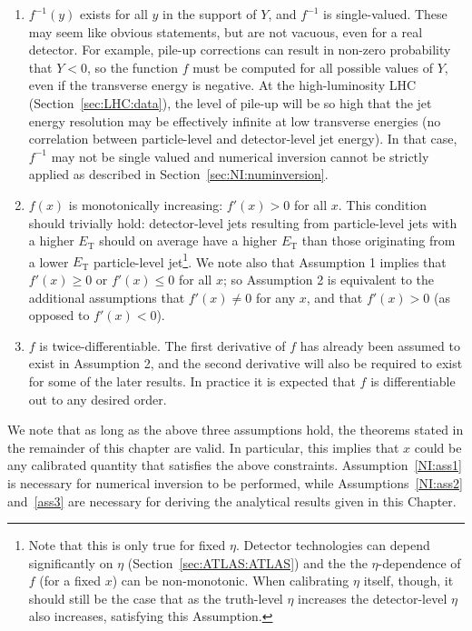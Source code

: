 \begin{enumerate}
  \item $f^{-1}(y)$ exists for all $y$ in the support of $Y$, and $f^{-1}$ is single-valued.  These may seem like obvious statements, but are not vacuous, even for a real detector.  For example, pile-up corrections can result in non-zero probability that $Y<0$, so the function $f$ must be computed for all possible values of $Y$, even if the transverse energy is negative.  At the high-luminosity LHC (Section~\ref{sec:LHC:data}), the level of pile-up will be so high that the jet energy resolution may be effectively infinite at low transverse energies (no correlation between particle-level and detector-level jet energy).  In that case, $f^{-1}$ may not be single valued and numerical inversion cannot be strictly applied as described in Section~\ref{sec:NI:numinversion}.
    \label{NI:ass1}
  \item $f(x)$ is monotonically increasing: $f'(x)>0$ for all $x$.  This condition should trivially hold: detector-level jets resulting from particle-level jets with a higher $E_\text{T}$ should on average have a higher $E_\text{T}$ than those originating from a lower $E_\text{T}$ particle-level jet\footnote{Note that this is only true for fixed $\eta$. Detector technologies can depend significantly on $\eta$ (Section~\ref{sec:ATLAS:ATLAS}) and the the $\eta$-dependence of $f$ (for a fixed $x$) can be non-monotonic. When calibrating $\eta$ itself, though, it should still be the case that as the truth-level $\eta$ increases the detector-level $\eta$ also increases, satisfying this Assumption.}. We note also that Assumption 1 implies that $f'(x)\ge 0$ or $f'(x) \le 0$ for all $x$; so Assumption 2 is equivalent to the additional assumptions that $f'(x)\ne 0$ for any $x$, and that $f'(x)>0$ (as opposed to $f'(x)<0$).
    \label{NI:ass2}
\item $f$ is twice-differentiable. The first derivative of $f$ has already been assumed to exist in Assumption 2, and the second derivative will also be required to exist for some of the later results. In practice it is expected that $f$ is differentiable out to any desired order.
    \label{NI:ass3}
\end{enumerate}

We note that as long as the above three assumptions hold, the theorems stated in the remainder of this chapter are valid.
In particular, this implies that $x$ could be any calibrated quantity that satisfies the above constraints.
Assumption~\ref{NI:ass1} is necessary for numerical inversion to be performed, while Assumptions~\ref{NI:ass2} and~\ref{ass3} are necessary for deriving the analytical results given in this Chapter.

